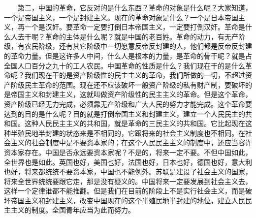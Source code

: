 \documentclass[cn,11pt,chinese]{elegantbook}
\begin{document}
　　第二，中国的革命，它反对的是什么东西？革命的对象是什么呢？大家知道，一个是帝国主义，一个是封建主义。现在的革命对象是什么？一个是日本帝国主义，再一个是汉奸。要革命一定要打倒日本帝国主义，一定要打倒汉奸。革命是什么人去干呢？革命的主体是什么呢？就是中国的老百姓。革命的动力，有无产阶级，有农民阶级，还有其它阶级中一切愿意反帝反封建的人，他们都是反帝反封建的革命力量。但是这许多人中间，什么人是根本的力量，是革命的骨干呢？就是占全国人口百分之九十的工人农民。中国革命的性质是什么？我们现在干的是什么革命呢？我们现在干的是资产阶级性的民主主义的革命，我们所做的一切，不超过资产阶级民主革命的范围。现在还不应该破坏一般资产阶级的私有财产制，要破坏的是帝国主义和封建主义，这就叫做资产阶级性的民主主义的革命。但是这个革命，资产阶级已经无力完成，必须靠无产阶级和广大人民的努力才能完成。这个革命要达到的目的是什么呢？目的就是打倒帝国主义和封建主义，建立一个人民民主的共和国。这种人民民主主义的共和国，就是革命的三民主义的共和国。它比起现在这种半殖民地半封建的状态来是不相同的，它跟将来的社会主义制度也不相同。在社会主义的社会制度中是不要资本家的；在这个人民民主主义的制度中，还应当容许资本家存在。中国是否永远要资本家呢？不是的，将来一定不要。不但中国如此，全世界也是如此。英国也好，美国也好，法国也好，日本也好，德国也好，意大利也好，将来都统统不要资本家，中国也不能例外。苏联是建设了社会主义的国家，将来全世界统统要跟它走，那是没有疑义的。中国将来一定要发展到社会主义去，这样一个定律谁都不能推翻。但是我们在目前的阶段上不是实行社会主义，而是破坏帝国主义和封建主义，改变中国现在的这个半殖民地半封建的地位，建立人民民主主义的制度。全国青年应当为此而努力。\\
\end{document}
